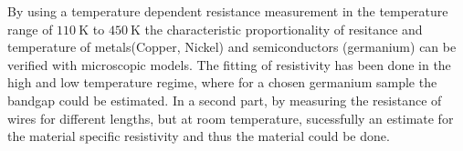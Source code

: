 
By using a temperature dependent resistance measurement in the temperature range of $\SI{110}{\kelvin}$ to $\SI{450}{\kelvin}$ the characteristic proportionality of resitance and temperature of
metals(Copper, Nickel) and semiconductors (germanium) can be verified with microscopic models. The fitting of resistivity has been done in the high and low temperature regime, where for a chosen germanium sample the bandgap could be estimated.
In a second part, by measuring the resistance of wires for different lengths, but at room temperature, sucessfully an estimate for the material specific resistivity and thus the material could be done.

